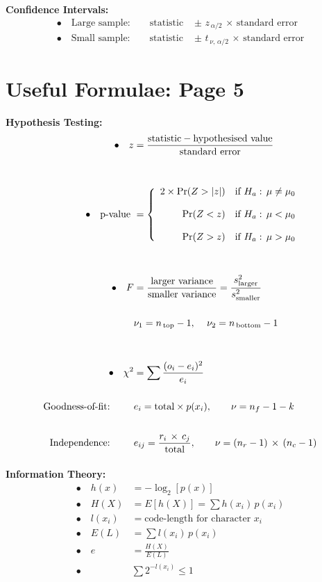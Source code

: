 \documentclass[12pt]{article}
\begin{document}
{\bf Confidence Intervals:}\\[-0.5cm]
\begin{align*}
\bullet\quad \text{Large sample:} \qquad \text{statistic } &\pm\,\, z_{\,\alpha/2}\,\times\,\text{standard error} \\[0.6cm]
\bullet\quad \text{Small sample:} \qquad \text{statistic } &\pm\,\, t_{\,\nu,\,\alpha/2}\,\times\,\text{standard error}
\end{align*}

\newpage

\section*{Useful Formulae: Page 5\\[0.3cm]}
{\bf Hypothesis Testing:}\\[-0.5cm]
\begin{align*}
\bullet\quad z &= \frac{\text{statistic}-\text{hypothesised value}}{\text{standard error}} \\[1cm]
\bullet\quad \text{p-value } &= \left\{
\begin{array}{rl}
2 \times \Pr(Z > |z|) & \text{if }  H_a: \, \mu \ne \mu_0\\[0.4cm]
\Pr(Z < z) & \text{if } H_a: \, \mu < \mu_0\\[0.4cm]
\Pr(Z > z) & \text{if } H_a: \, \mu > \mu_0\\
\end{array} \right.\\[1cm]
\bullet\quad F &= \frac{\text{larger variance}}{\text{smaller variance}} = \frac{s_{\text{larger}}^2}{s_{\text{smaller}}^2} \\[0.5cm]
 & \nu_1 = n_{\text{\,top}} - 1,\quad\, \nu_2 = n_{\text{\,bottom}} - 1 \\[1cm]
\bullet\quad \chi^2 &= \sum \frac{(o_i-e_i)^2}{e_i}\\[0.5cm]
\text{Goodness-of-fit: } \qquad &e_i = \text{total} \times p(x_i),\qquad \nu = n_f - 1- k \\[0.6cm]
\text{Independence: } \qquad &e_{ij} = \frac{r_i\,\times\,c_j}{\text{total}},\qquad \nu = (n_r - 1)\,\times\,(n_c - 1)\\[0.3cm]
\end{align*}
{\bf Information Theory:}\\[-0.5cm]
\begin{align*}
\bullet\quad h(x) &= - \log_2[p(x)] \\[0.6cm]
\bullet\quad H(X) &= E[h(X)] = \sum h(x_i)\,p(x_i) \\[1cm]
\bullet\quad l(x_i) &= \text{code-length for character } x_i \\[0.6cm]
\bullet\quad E(L) &= \sum l(x_i)\,p(x_i) \\[1cm]
\bullet\quad e &= \frac{H(X)}{E(L)} \\[1cm]
\bullet\quad &\sum 2^{-l(x_i)}  \le 1
\end{align*}
\end{document}
